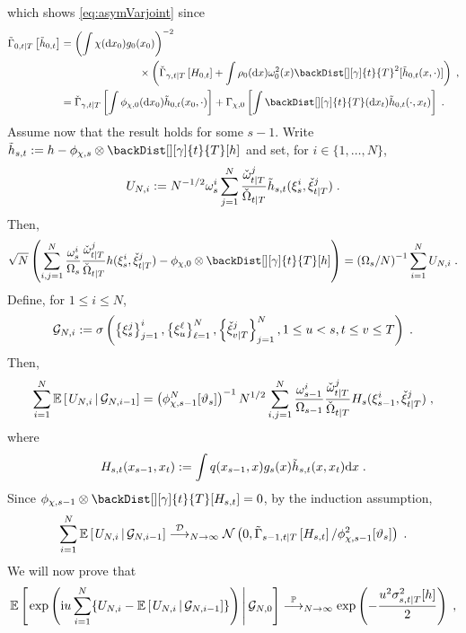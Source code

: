 which shows \eqref{eq:asymVarjoint} since
\begin{align*}
\asymVarJoint{0,t}{T}{\tilde{h}_{0,t}} &= \left(\int \Xinit(\rmd x_0) g_0(x_0)\right)^{-2}\\
&\hspace{2.6cm}\times\left(\backasymVar[\gamma]{t}{T}{H_{0,t}} + \int \XinitIS{0}(\rmd x)\ewght{0}{2}(x)\backDist[][\gamma]{t}{T}^2[\tilde{h}_{0,t}(x,\cdot)]\right)\eqsp,\\
&=   \backasymVar[\gamma]{t}{T}{\int \filt{\Xinit,0}(\rmd x_0)\tilde{h}_{0,t}(x_0,\cdot)} + \asymVar[\Xinit]{0}{\int \backDist[][\gamma]{t}{T}(\rmd x_t)\tilde{h}_{0,t}(\cdot,x_t)} \eqsp.
\end{align*}
Assume now that the result holds for some $s-1$.
Write $\tilde{h}_{s,t}\eqdef h - \filt{\Xinit,s}\otimes \backDist[][\gamma]{t}{T}[h]$ and set, for $i \in \{1,\dots,N\}$,
\begin{equation*}
U_{N,i} \eqdef N^{-1/2}\swght{s}{i}\sum_{j=1}^N \frac{\ebackwght{t}{T}{j}}{\backsumwght{t}{T}} \tilde{h}_{s,t}(\epartpred{s}{i},\ebackpart{t}{T}{j})\eqsp.
\end{equation*}
Then,
\[
\sqrt{N}\left(\sum_{i,j=1}^N \frac{\swght{s}{i}}{\sumwght{s}}\frac{\ebackwght{t}{T}{j}}{\backsumwght{t}{T}} h(\epartpred{s}{i},\ebackpart{t}{T}{j}) - \filt{\Xinit,0}\otimes \backDist[][\gamma]{t}{T}[h]
\right) = \left(\sumwght{s}/N\right)^{-1}\sum_{i=1}^N U_{N,i}\eqsp.
\]
Define, for $1 \leq i \leq N$,
\[
\mcg{N,i}\eqdef \sigma \left( \left\{ \epart{s}{j} \right\}_{j=1}^i, \left\{ \epart{u}{\ell} \right\}_{\ell=1}^N, \left\{ \ebackpart{v}{T}{j} \right\}_{j=1}^N,  1 \leq u < s, t \leq v \leq T\right) \eqsp.
\]
Then,
$$
\sum_{i=1}^N \CPE{U_{N,i}}{\mcg{N,i-1}} = \left( \filt{\chi,s-1}^N[\adjfuncforward{s}] \right)^{-1} N^{1/2}\sum_{i,j=1}^N\frac{\swght{s-1}{i}}{\sumwght{s-1}}\frac{\ebackwght{t}{T}{j}}{\backsumwght{t}{T}} H_s(\epartpred{s-1}{i}, \ebackpart{t}{T}{j})\eqsp,
$$
where
\begin{equation}
\label{eq:def:Hst}
H_{s,t}(x_{s-1},x_t) := \int q(x_{s-1},x)g_s(x)\tilde{h}_{s,t}(x,x_t)\mathrm{d} x\;.
\end{equation}
Since $\filt{\chi,s-1}\otimes \backDist[][\gamma]{t}{T}[H_{s,t}]=0$,
by the induction assumption,
$$
\sum_{i=1}^N \CPE{U_{N,i}}{\mcg{N,i-1}} \dlim_{N \to \infty} \mathcal{N}\left(0, \asymVarJoint{s-1,t}{T}{H_{s,t}}/ \filt{\chi,s-1}^2[\adjfuncforward{s}] \right) \eqsp.
$$
We will now prove that
\[
\CPE{\exp\left(\rmi u \sum_{i=1}^N \{U_{N,i}-\CPE{U_{N,i}}{\mcg{N,i-1}}\} \right)}{\mcg{N,0}} \plim_{N \to \infty} \exp\left(-\frac{u^2 \sigma^2_{s,t|T}[h]}{2}\right) \eqsp,
\]

